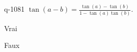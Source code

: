 \begin{truefalse}{q-1081}
$\tan(a-b)=\frac{\tan(a) - \tan(b)}{1-\tan(a)\tan(b)}$.
\item Vrai
\item* Faux
\end{truefalse}

